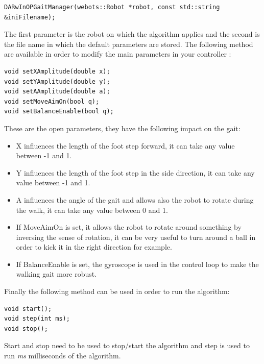 \documentclass[a4paper, 12pt]{article}  		%
\begin{document}
\lstset{language=c++} 
\lstset{commentstyle=\textit} 
\begin{lstlisting} 
DARwInOPGaitManager(webots::Robot *robot, const std::string &iniFilename);
\end{lstlisting}

The first parameter is the robot on which the algorithm applies and the second is the file name in which the default parameters are stored. The following method are available in order to modify the main parameters in your controller :\\

\lstset{language=c++} 
\lstset{commentstyle=\textit} 
\begin{lstlisting} 
void setXAmplitude(double x);
void setYAmplitude(double y);
void setAAmplitude(double a);
void setMoveAimOn(bool q);
void setBalanceEnable(bool q);
\end{lstlisting}

These are the open parameters, they have the following impact on the gait:\\
\begin{itemize}
\item X influences the length of the foot step forward, it can take any value between -1 and 1.
\item Y influences the length of the foot step in the side direction, it can take any value between -1 and 1.
\item A influences the angle of the gait and allows also the robot to rotate during the walk, it can take any value between 0 and 1.
\item If MoveAimOn is set, it allows the robot to rotate around something by inversing the sense of rotation, it can be very useful to turn around a ball in order to kick it in the right direction for example.
\item If BalanceEnable is set, the gyroscope is used in the control loop to make the walking gait more robust.
\end{itemize}

Finally the following method can be used in order to run the algorithm:\\
\lstset{language=c++} 
\lstset{commentstyle=\textit} 
\begin{lstlisting} 
void start();
void step(int ms);
void stop();
\end{lstlisting}
Start and stop need to be used to stop/start the algorithm and step is used to run \textit{ms} milliseconds of the algorithm.\\
\end{document}
